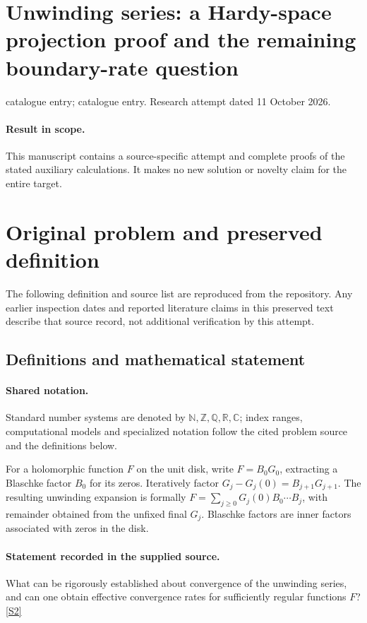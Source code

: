 \documentclass[11pt]{article}
\begin{document}
\section*{Unwinding series: a Hardy-space projection proof and the remaining boundary-rate question}
\noindent catalogue entry; catalogue entry. Research attempt dated 11 October 2026.
\paragraph{Result in scope.}This manuscript contains a source-specific attempt and complete proofs of the stated auxiliary calculations. It makes no new solution or novelty claim for the entire target.
\section{Original problem and preserved definition}
The following definition and source list are reproduced from the repository. Any earlier inspection dates and reported literature claims in this preserved text describe that source record, not additional verification by this attempt.
\subsection{Definitions and mathematical statement}

\paragraph{Shared notation.}Standard number systems are denoted by $\mathbb N,\mathbb Z,\mathbb Q,\mathbb R,\mathbb C$; index ranges, computational models and specialized notation follow the cited problem source and the definitions below.


For a holomorphic function $F$ on the unit disk, write $F=B_0G_0$, extracting a Blaschke factor $B_0$ for its zeros. Iteratively factor $G_j-G_j(0)=B_{j+1}G_{j+1}$. The resulting unwinding expansion is formally $F=\sum_{j\geq0}G_j(0)B_0\cdots B_j$, with remainder obtained from the unfixed final $G_j$. Blaschke factors are inner factors associated with zeros in the disk.
\paragraph{Statement recorded in the supplied source.}
What can be rigorously established about convergence of the unwinding series, and can one obtain effective convergence rates for sufficiently regular functions $F$? \href{https://doi.org/10.4171/owr/2021/55}{[S2]}
\end{document}
